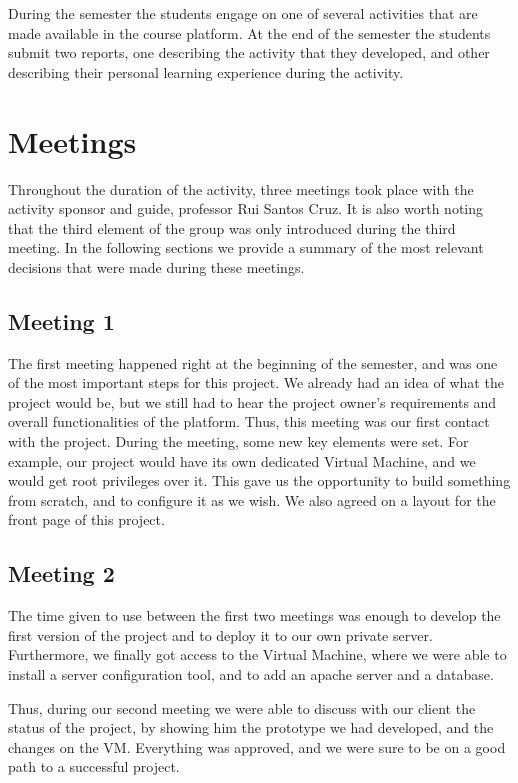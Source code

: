 \documentclass[a4paper,12pt,journal,twoside,compsoc]{PPIEEEtran}
\begin{document}
During the semester the students engage on one of several activities that are made available in the course platform. At the end of the semester the students submit two reports, one describing the activity that they developed, and other describing their personal learning experience during the activity.


\section{Meetings}

Throughout the duration of the activity, three meetings took place with the activity sponsor and guide, professor Rui Santos Cruz. It is also worth noting that the third element of the group was only introduced during the third meeting. In the following sections we provide a summary of the most relevant decisions that were made during these meetings. 

\subsection{Meeting 1}

The first meeting happened right at the beginning of the semester, and was one of the most important steps for this project. We already had an idea of what the project would be, but we still had to hear the project owner’s requirements and overall functionalities of the platform. Thus, this meeting was our first contact with the project. During the meeting, some new key elements were set. For example, our project would have its own dedicated Virtual Machine, and we would get root privileges over it. This gave us the opportunity to build something from scratch, and to configure it as we wish. We also agreed on a layout for the front page of this project.
	
\subsection{Meeting 2}

The time given to use between the first two meetings was enough to develop the first version of the project and to deploy it to our own private server. Furthermore, we finally got access to the Virtual Machine, where we were able to install a server configuration tool, and to add an apache server and a database.

Thus, during our second meeting we were able to discuss with our client the status of the project, by showing him the prototype we had developed, and the changes on the VM. Everything was approved, and we were sure to be on a good path to a successful project.
\end{document}
